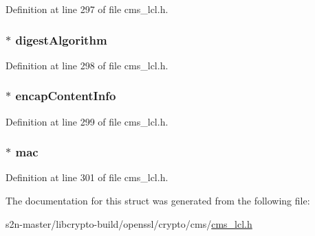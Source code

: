 Definition at line 297 of file cms\+\_\+lcl.\+h.

\subsubsection[{\texorpdfstring{digest\+Algorithm}{digestAlgorithm}}]{$\ast$ digest\+Algorithm}\hypertarget{struct_c_m_s___authenticated_data__st_a3db9734e20b06af31aabcfcfc6b62797}{}\label{struct_c_m_s___authenticated_data__st_a3db9734e20b06af31aabcfcfc6b62797}


Definition at line 298 of file cms\+\_\+lcl.\+h.

\subsubsection[{\texorpdfstring{encap\+Content\+Info}{encapContentInfo}}]{$\ast$ encap\+Content\+Info}\hypertarget{struct_c_m_s___authenticated_data__st_a436b5725775d32c6f9a979b8d5a4f8b5}{}\label{struct_c_m_s___authenticated_data__st_a436b5725775d32c6f9a979b8d5a4f8b5}


Definition at line 299 of file cms\+\_\+lcl.\+h.

\subsubsection[{\texorpdfstring{mac}{mac}}]{$\ast$ mac}\hypertarget{struct_c_m_s___authenticated_data__st_aa893ed9bbf8c8c1ebc8af697cac800c6}{}\label{struct_c_m_s___authenticated_data__st_aa893ed9bbf8c8c1ebc8af697cac800c6}


Definition at line 301 of file cms\+\_\+lcl.\+h.



The documentation for this struct was generated from the following file\+:\begin{DoxyCompactItemize}
\item 
s2n-\/master/libcrypto-\/build/openssl/crypto/cms/\hyperlink{cms__lcl_8h}{cms\+\_\+lcl.\+h}\end{DoxyCompactItemize}
